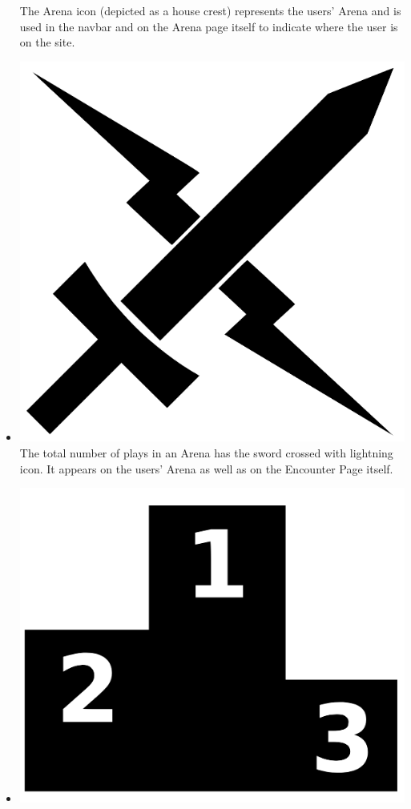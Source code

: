 \documentclass[12pt,a4paper]{report}
\begin{document}
\begin{itemize}
		The Arena icon (depicted as a house crest) represents the users' Arena and is used in the navbar and on the Arena page itself to indicate where the user is on the site.
		\item \includegraphics[scale=.03]{sword_lightning}
		The total number of plays in an Arena has the sword crossed with lightning icon. It appears on the users' Arena as well as on the Encounter Page itself.
		\item \includegraphics[scale=.03]{win_rate}

\end{itemize}
\end{document}
